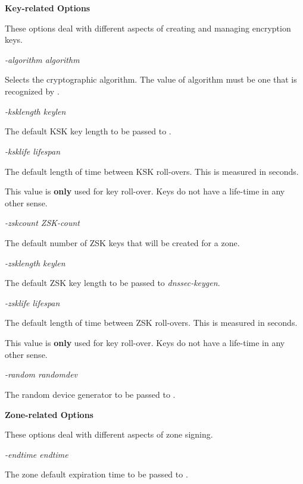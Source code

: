 {\bf Key-related Options}

These options deal with different aspects of creating and managing
encryption keys.

\begin{description}

\item {\it -algorithm algorithm}\verb" "

Selects the cryptographic algorithm. The value of algorithm must be one that
is recognized by .

\item {\it -ksklength keylen}\verb" "

The default KSK key length to be passed to .

\item {\it -ksklife lifespan}\verb" "

The default length of time between KSK roll-overs.  This is measured in   
seconds.

This value is {\bf only} used for key roll-over.  Keys do not have a life-time
in any other sense.

\item {\it -zskcount ZSK-count}\verb" "

The default number of ZSK keys that will be created for a zone.

\item {\it -zsklength keylen}\verb" "

The default ZSK key length to be passed to {\it dnssec-keygen}.

\item {\it -zsklife lifespan}\verb" "

The default length of time between ZSK roll-overs.  This is measured in   
seconds.

This value is {\bf only} used for key roll-over.  Keys do not have a life-time
in any other sense.

\item {\it -random randomdev}\verb" "

The random device generator to be passed to .

\end{description}

{\bf Zone-related Options}

These options deal with different aspects of zone signing.

\begin{description}

\item {\it -endtime endtime}\verb" "

The zone default expiration time to be passed to .

\end{description}

